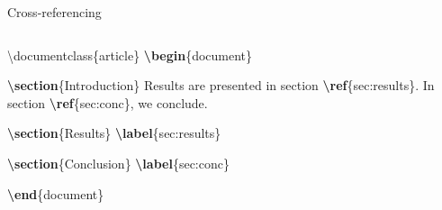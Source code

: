 \documentclass[,aspectratio=43]{beamer}
\newcommand{\VERB}{\Verb[commandchars=\\\{\}]}
\newenvironment{Shaded}{\begin{snugshade}}{\end{snugshade}}
\newcommand{\BuiltInTok}[1]{#1}
\newcommand{\ExtensionTok}[1]{#1}
\newcommand{\KeywordTok}[1]{\textcolor[rgb]{0.00,0.44,0.13}{\textbf{#1}}}
\newcommand{\NormalTok}[1]{#1}
\providecommand{\tightlist}{%
  \setlength{\itemsep}{0pt}\setlength{\parskip}{0pt}}
\begin{document}
\begin{frame}[fragile]{Cross-referencing}
\protect\hypertarget{cross-referencing}{}

\begin{columns}[T]
\begin{column}{0.53\textwidth}
\footnotesize
\vspace{-1em}

\begin{Shaded}
\begin{Highlighting}[]
\BuiltInTok{\textbackslash{}documentclass}\NormalTok{\{}\ExtensionTok{article}\NormalTok{\} }
\KeywordTok{\textbackslash{}begin}\NormalTok{\{}\ExtensionTok{document}\NormalTok{\}}

\KeywordTok{\textbackslash{}section}\NormalTok{\{Introduction\}}
\NormalTok{Results are presented in section }
\KeywordTok{\textbackslash{}ref}\NormalTok{\{}\ExtensionTok{sec:results}\NormalTok{\}.}
\NormalTok{In section }\KeywordTok{\textbackslash{}ref}\NormalTok{\{}\ExtensionTok{sec:conc}\NormalTok{\}, we conclude.}

\KeywordTok{\textbackslash{}section}\NormalTok{\{Results\}}
\KeywordTok{\textbackslash{}label}\NormalTok{\{}\ExtensionTok{sec:results}\NormalTok{\}}

\KeywordTok{\textbackslash{}section}\NormalTok{\{Conclusion\}}
\KeywordTok{\textbackslash{}label}\NormalTok{\{}\ExtensionTok{sec:conc}\NormalTok{\}}

\KeywordTok{\textbackslash{}end}\NormalTok{\{}\ExtensionTok{document}\NormalTok{\}}
\end{Highlighting}
\end{Shaded}
\end{column}


\end{columns}
\end{frame}
\end{document}
